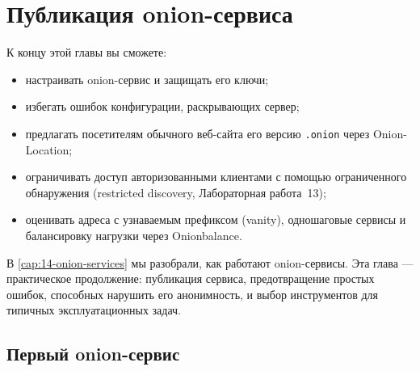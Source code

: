 \chapter{Публикация onion-сервиса}\label{cap:21-onion-pratica}

\begin{obiettivi}
К концу этой главы вы сможете:
\begin{itemize}[nosep]
  \item настраивать onion-сервис и защищать его ключи;
  \item избегать ошибок конфигурации, раскрывающих сервер;
  \item предлагать посетителям обычного веб-сайта его версию \texttt{.onion} через Onion-Location;
  \item ограничивать доступ авторизованными клиентами с помощью ограниченного обнаружения (restricted discovery, Лабораторная работа~13);
  \item оценивать адреса с узнаваемым префиксом (vanity), одношаговые сервисы и балансировку нагрузки через Onionbalance.
\end{itemize}
\end{obiettivi}

В \cref{cap:14-onion-services} мы разобрали, как работают onion-сервисы. Эта глава — практическое продолжение: публикация сервиса, предотвращение простых ошибок, способных нарушить его анонимность, и выбор инструментов для типичных эксплуатационных задач.

\section{Первый onion-сервис}\label{sec:onionp-primo}

